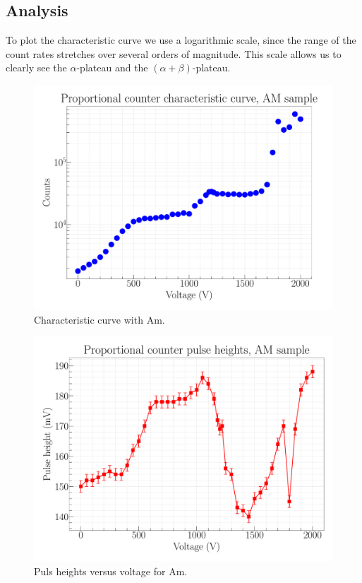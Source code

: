 \subsection{Analysis}

To plot the characteristic curve we use a logarithmic scale, since the range of the count rates stretches over several orders of magnitude. This scale allows us to clearly see the $\alpha$-plateau and the $(\alpha+\beta)$-plateau. 

\begin{figure}[H]
\centering
\includegraphics[width=\textwidth]{../Figures/Proportional_characteristic_curve_AM.pdf}
\caption{Characteristic curve with Am.}
\label{fig:AmChar}
\end{figure}

\begin{figure}[H]
\centering
\includegraphics[width=\textwidth]{../Figures/Proportional_pulse_heights_AM.pdf}
\caption{Puls heights versus voltage for Am.}
\label{fig:AmPH}
\end{figure}


